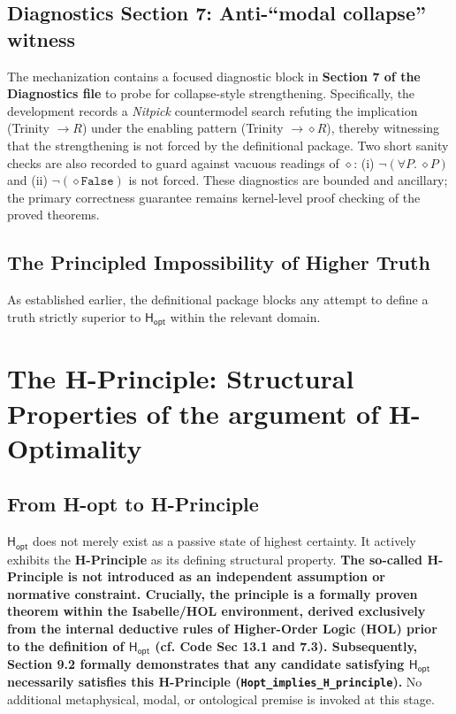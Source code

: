 \documentclass[a4paper, 11pt]{article}
\theoremstyle{plain}
\theoremstyle{definition}
\newcommand{\Hopt}{\mathsf{H_{opt}}}       %
\begin{document}
\subsection{Diagnostics Section 7: Anti-``modal collapse'' witness}
The mechanization contains a focused diagnostic block in \textbf{Section 7 of the Diagnostics file} to probe for collapse-style strengthening.
Specifically, the development records a \textit{Nitpick} countermodel search refuting the implication (Trinity $\rightarrow R$) under the enabling pattern (Trinity $\rightarrow \diamond R$), thereby witnessing that the strengthening is not forced by the definitional package.
Two short sanity checks are also recorded to guard against vacuous readings of $\diamond$: (i) $\neg(\forall P.\ \diamond P)$ and (ii) $\neg(\diamond \texttt{False})$ is not forced.
These diagnostics are bounded and ancillary; the primary correctness guarantee remains kernel-level proof checking of the proved theorems.

\subsection{The Principled Impossibility of Higher Truth}
\label{sec:impossibility_higher_truth}

As established earlier, the definitional package blocks any attempt to define a truth strictly superior to $\Hopt$ within the relevant domain.

\section{The H-Principle: Structural Properties of the argument of H-Optimality}
\label{sec:h_principle_structural}

\subsection{From H-opt to H-Principle}
\label{subsec:Hopt_to_principle}
$\Hopt$ does not merely exist as a passive state of highest certainty. It actively exhibits the \textbf{H-Principle} as its defining structural property. \textbf{The so-called H-Principle is not introduced as an independent assumption or normative constraint. Crucially, the principle is a formally proven theorem within the Isabelle/HOL environment, derived exclusively from the internal deductive rules of Higher-Order Logic (HOL) prior to the definition of $\Hopt$ (cf. Code Sec 13.1 and 7.3). Subsequently, Section 9.2 formally demonstrates that any candidate satisfying $\Hopt$ necessarily satisfies this H-Principle (\texttt{Hopt\_implies\_H\_principle}).} No additional metaphysical, modal, or ontological premise is invoked at this stage.
\end{document}

